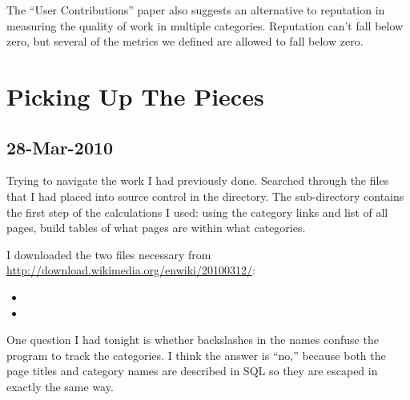 The ``User Contributions'' paper also suggests an alternative
to reputation in measuring the quality of work in multiple categories.
Reputation can't fall below zero, but several of the metrics we
defined are allowed to fall below zero.

\section{Picking Up The Pieces}

\subsection{28-Mar-2010}

Trying to navigate the work I had previously done.
Searched through the files that I had placed into
source control in the  directory.
The  sub-directory contains the first
step of the calculations I used: using the category
links and list of all pages, build tables of what
pages are within what categories.

I downloaded the two files necessary from
\url{http://download.wikimedia.org/enwiki/20100312/}:
\begin{itemize}
\item {}
\item {}
\end{itemize}

One question I had tonight is whether backslashes
in the names confuse the program to track the categories.
I think the answer is ``no,'' because both the page titles
and category names are described in SQL so they are escaped
in exactly the same way.

